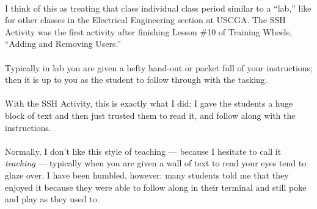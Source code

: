 \documentclass[11pt]{article}
\begin{document}
	\paragraph{} I think of this as treating that class individual class period similar to a ``lab,'' like for other classes in the Electrical Engineering section at USCGA. The SSH Activity was the first activity after finishing Lesson \#10 of Training Wheels, ``Adding and Removing Users.'' 

	\paragraph{} Typically in lab you are given a hefty hand-out or packet full of your instructions; then it is up to you as the student to follow through with the tasking.

	\paragraph{} With the SSH Activity, this is exactly what I did: I gave the students a huge block of text and then just trusted them to read it, and follow along with the instructions.

	\paragraph{} Normally, I don't like this style of teaching --- because I hesitate to call it \textit{teaching} --- typically when you are given a wall of text to read your eyes tend to glaze over. I have been humbled, however: many students told me that they enjoyed it because they were able to follow along in their terminal and still poke and play as they used to.

	\paragraph{}

	\begin{center}
		\graphicspath{ {.} }
		\centering
	\end{center}

	\paragraph{}
\end{document}
